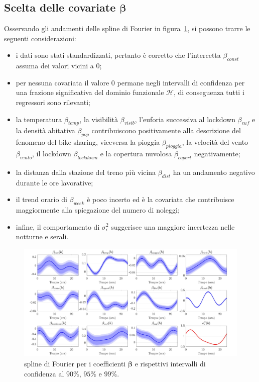 \subsection{Scelta delle covariate $\boldsymbol{\beta}$}
Osservando gli andamenti delle spline di Fourier in figura~\ref{trend_beta}, si possono trarre le seguenti considerazioni:
\begin{itemize}
	\item i dati sono stati standardizzati, pertanto è corretto che l'intercetta $\beta_{const}$ assuma dei valori vicini a \num{0};
	\item per nessuna covariata il valore \num{0} permane negli intervalli di confidenza per una frazione significativa del dominio funzionale $\mathcal{H}$, di conseguenza tutti i regressori sono rilevanti;
	\item la temperatura $\beta_{temp}$, la visibilità $\beta_{visib}$, l'euforia successiva al lockdown $\beta_{euf}$ e la densità abitativa $\beta_{pop}$ contribuiscono positivamente alla descrizione del fenomeno del bike sharing, viceversa la pioggia $\beta_{pioggia}$, la velocità del vento $\beta_{vento}$, il lockdown $\beta_{lockdown}$ e la copertura nuvolosa $\beta_{copert}$ negativamente;
	\item la distanza dalla stazione del treno più vicina $\beta_{dist}$ ha un andamento negativo durante le ore lavorative;
	\item il trend orario di $\beta_{week}$ è poco incerto ed è la covariata che contribuisce maggiormente alla spiegazione del numero di noleggi;
	\item infine, il comportamento di $\sigma_\epsilon^2$ suggerisce una maggiore incertezza nelle notturne e serali. 
\end{itemize}

\begin{figure}[htpb]
	\centering
	\includegraphics[height=215px]{Immagini/4. Caso di studio/Model selection/Trend spline, rho=100m}
	\caption[Spline di Fourier per i coefficienti $\boldsymbol{\beta}$ e rispettivi intervalli di confidenza]{spline di Fourier per i coefficienti $\boldsymbol{\beta}$ e rispettivi intervalli di confidenza al $90\%$, $95\%$ e $99\%$.}
	\label{trend_beta}
\end{figure}

